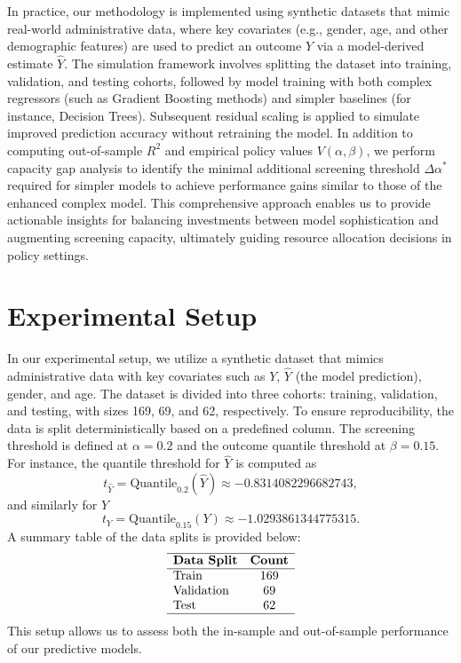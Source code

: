 \documentclass{article} %
\begin{document}
In practice, our methodology is implemented using synthetic datasets that mimic real-world administrative data, where key covariates (e.g., gender, age, and other demographic features) are used to predict an outcome \(Y\) via a model-derived estimate \(\hat{Y}\). The simulation framework involves splitting the dataset into training, validation, and testing cohorts, followed by model training with both complex regressors (such as Gradient Boosting methods) and simpler baselines (for instance, Decision Trees). Subsequent residual scaling is applied to simulate improved prediction accuracy without retraining the model. In addition to computing out-of-sample \(R^2\) and empirical policy values \(V(\alpha,\beta)\), we perform capacity gap analysis to identify the minimal additional screening threshold \(\Delta \alpha^*\) required for simpler models to achieve performance gains similar to those of the enhanced complex model. This comprehensive approach enables us to provide actionable insights for balancing investments between model sophistication and augmenting screening capacity, ultimately guiding resource allocation decisions in policy settings.

\section{Experimental Setup}
In our experimental setup, we utilize a synthetic dataset that mimics administrative data with key covariates such as \(Y\), \(\hat{Y}\) (the model prediction), gender, and age. The dataset is divided into three cohorts: training, validation, and testing, with sizes 169, 69, and 62, respectively. To ensure reproducibility, the data is split deterministically based on a predefined column. The screening threshold is defined at \(\alpha = 0.2\) and the outcome quantile threshold at \(\beta = 0.15\). For instance, the quantile threshold for \(\hat{Y}\) is computed as 
\[
t_{\hat{Y}} = \text{Quantile}_{0.2}(\hat{Y}) \approx -0.8314082296682743,
\]
and similarly for \(Y\)
\[
t_Y = \text{Quantile}_{0.15}(Y) \approx -1.0293861344775315.
\]
A summary table of the data splits is provided below:
\[
\begin{array}{lc}
\hline
\textbf{Data Split} & \textbf{Count} \\
\hline
\text{Train} & 169 \\
\text{Validation} & 69 \\
\text{Test} & 62 \\
\hline
\end{array}
\]
This setup allows us to assess both the in-sample and out-of-sample performance of our predictive models.
\end{document}
